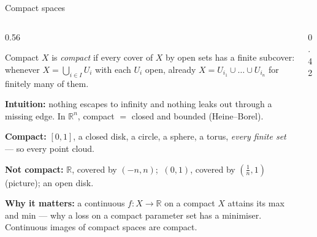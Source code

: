 \documentclass[10pt,aspectratio=169]{beamer}
\newcommand{\R}{\mathbb{R}}
\newcommand{\HL}[1]{\textcolor{blue!70!black}{#1}}
\begin{document}
    \begin{frame}[shrink=3]{Compact spaces}
        \begin{columns}[T,onlytextwidth]
            \begin{column}{0.56\textwidth}
                \small
                \begin{block}{Compact}
                    $X$ is \emph{compact} if every cover of $X$ by open sets has a finite
                    subcover: whenever $X=\bigcup_{i\in I}U_i$ with each $U_i$ open, already
                    $X=U_{i_1}\cup\dots\cup U_{i_n}$ for finitely many of them.
                \end{block}
                \textbf{Intuition:} nothing escapes to infinity and nothing leaks out
                through a missing edge. In $\R^n$, compact $=$ \HL{closed and bounded}
                (Heine--Borel).

                \vspace{0.3em}
                \textbf{Compact:} $[0,1]$, a closed disk, a circle, a sphere, a torus,
                \emph{every finite set} --- so every point cloud.

                \vspace{0.2em}
                \textbf{Not compact:} $\R$, covered by $(-n,n)$; $\ (0,1)$, covered by
                $(\tfrac1n,1)$ (picture); an open disk.

                \vspace{0.3em}
                \textbf{Why it matters:} a continuous $f:X\to\R$ on a compact $X$ attains
                its max and min --- why a loss on a compact parameter set has a
                minimiser. Continuous images of compact spaces are compact.
            \end{column}
            \begin{column}{0.42\textwidth}
                \centering


\end{column}
\end{columns}
\end{frame}
\end{document}
